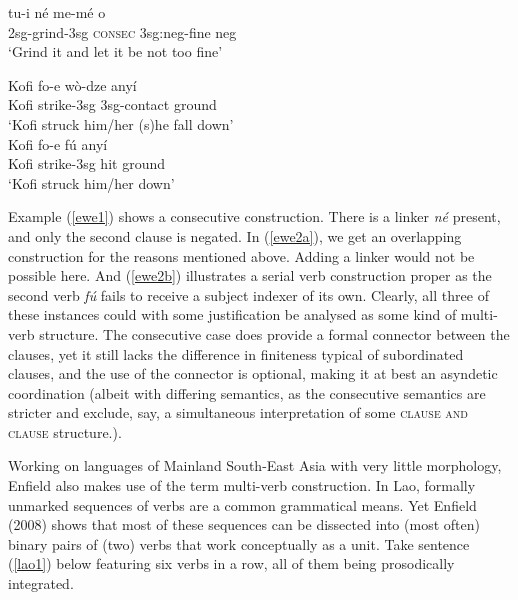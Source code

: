 \ex \label{ewe1} 
\gll tu-i né me-mé o \\
\acs{2}\acs{sg}-grind-\acs{3}\acs{sg} \textsc{consec} \acs{3}\acs{sg}:\acs{neg}-fine \acs{neg} \\
\glft `Grind it and let it be not too fine' \\ 
\z
\xe

\pex 
\a \label{ewe2a}
\gll Kofi fo-e wò-dze anyí \\
Kofi strike-\acs{3}\acs{sg} \acs{3}\acs{sg}-contact ground \\
\glft `Kofi struck him/her (s)he fall down' \\ 
\z
\a \label{ewe2b}
\gla Kofi fo-e fú anyí \\ 
Kofi strike-\acs{3}\acs{sg} hit ground \\
\glft `Kofi struck him/her down' \\ 
\z
\xe

Example (\ref{ewe1}) shows a consecutive construction. There is a linker \textit{né} present, and only the second clause is negated. In (\ref{ewe2a}), we get an overlapping construction for the reasons mentioned above. Adding a linker would not be possible here. And (\ref{ewe2b}) illustrates a serial verb construction proper as the second verb \textit{fú} fails to receive a subject indexer of its own. Clearly, all three of these instances could with some justification be analysed as some kind of multi-verb structure. The consecutive case does provide a formal connector between the clauses, yet it still lacks the difference in finiteness typical of subordinated clauses, and the use of the connector is optional, making it at best an asyndetic coordination (albeit with differing semantics, as the consecutive semantics are stricter and exclude, say, a simultaneous interpretation of some \textsc{clause and clause} structure.). 

Working on languages of Mainland South-East Asia with very little morphology, Enfield also makes use of the term multi-verb construction. In Lao, formally unmarked sequences of verbs are a common grammatical means. Yet Enfield (2008) shows that most of these sequences can be dissected into (most often) binary pairs of (two) verbs that work conceptually as a unit. Take sentence (\ref{lao1}) below featuring six verbs in a row, all of them being prosodically integrated.

